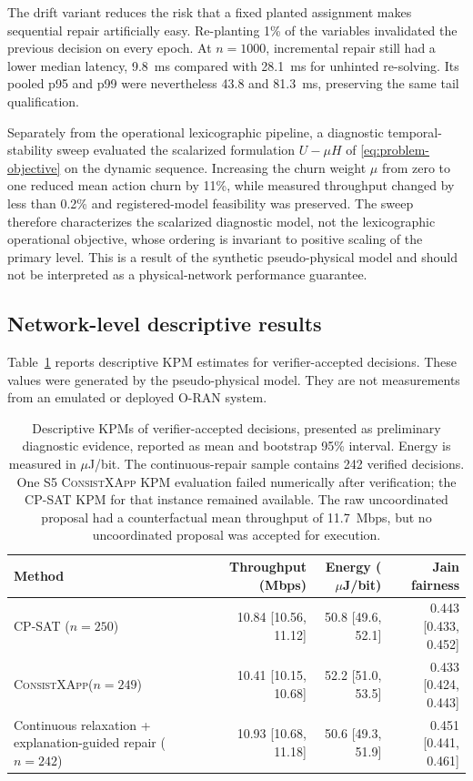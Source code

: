 \documentclass[pdflatex,sn-mathphys-num,iicol,oneside]{sn-jnl}
\newcommand{\method}{\textsc{ConsistXApp}\xspace}
\newcommand{\cpsat}{\textsc{CP-SAT}\xspace}
\begin{document}
The drift variant reduces the risk that a fixed planted assignment
makes sequential repair artificially easy. Re-planting 1\% of the
variables invalidated the previous decision on every epoch. At
$n=1000$, incremental repair still had a lower median latency,
9.8~ms compared with 28.1~ms for unhinted re-solving. Its pooled p95
and p99 were nevertheless 43.8 and 81.3~ms, preserving the same tail
qualification.

Separately from the operational lexicographic pipeline, a diagnostic
temporal-stability sweep evaluated the scalarized formulation
$U-\mu H$ of \eqref{eq:problem-objective} on the dynamic sequence.
Increasing the churn weight $\mu$ from zero to one reduced mean action
churn by 11\%, while measured throughput changed by less than 0.2\%
and registered-model feasibility was preserved. The sweep therefore
characterizes the scalarized diagnostic model, not the lexicographic
operational objective, whose ordering is invariant to positive
scaling of the primary level. This is a result of
the synthetic pseudo-physical model and should not be interpreted as
a physical-network performance guarantee.

\subsection{Network-level descriptive results}
\label{sec:kpi-results}

Table~\ref{tab:kpi} reports descriptive KPM estimates for
verifier-accepted decisions. These values were generated by the
pseudo-physical model. They are not measurements from an emulated or
deployed O-RAN system.

\begin{table}[t]
\centering
\caption{
Descriptive KPMs of verifier-accepted decisions, presented as preliminary diagnostic evidence, reported as mean and
bootstrap 95\% interval. Energy is measured in $\mu$J/bit. The
continuous-repair sample contains 242 verified decisions. One S5
\method KPM evaluation failed numerically after verification; the
\cpsat KPM for that instance remained available. The raw
uncoordinated proposal had a counterfactual mean throughput of
11.7~Mbps, but no uncoordinated proposal was accepted for execution.
}
\label{tab:kpi}
\setlength{\tabcolsep}{4pt}
\small

\begin{tabular}{lrrr}
\toprule
Method &
Throughput (Mbps) &
Energy ($\mu$J/bit) &
Jain fairness\\
\midrule

\cpsat{} ($n=250$)
&
10.84 [10.56, 11.12]
&
50.8 [49.6, 52.1]
&
0.443 [0.433, 0.452]
\\

\method ($n=249$)
&
10.41 [10.15, 10.68]
&
52.2 [51.0, 53.5]
&
0.433 [0.424, 0.443]
\\

\shortstack[l]{Continuous relaxation +\\explanation-guided repair ($n=242$)}
&
10.93 [10.68, 11.18]
&
50.6 [49.3, 51.9]
&
0.451 [0.441, 0.461]
\\

\bottomrule
\end{tabular}
\normalsize
\end{table}
\end{document}
